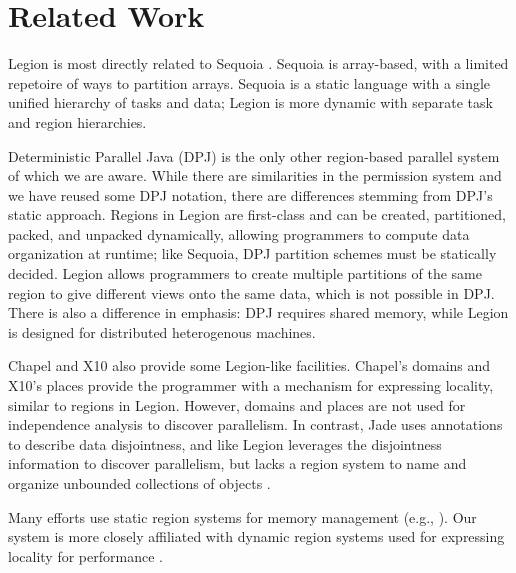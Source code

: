 
\section{Related Work}
\label{sec:related}
Legion is most directly related to Sequoia \cite{Fatahalian06}.  Sequoia is array-based, with
a limited repetoire of ways to partition arrays.  Sequoia is a static language with a single unified hierarchy
of tasks and data; Legion is more dynamic with separate task and region hierarchies.

Deterministic Parallel Java (DPJ) is the only other region-based parallel system of which we are
aware\cite{Bocchino09}.  While there are similarities in the permission system and we have
reused some DPJ notation, there are differences stemming from DPJ's static approach.
Regions in Legion are first-class and can be created, partitioned, packed, and unpacked 
dynamically, allowing programmers to compute data organization at runtime; like Sequoia, DPJ
partition schemes must be statically decided.  Legion allows 
programmers to create multiple partitions of the same region to give different 
views onto the same data, which is not possible in DPJ.  
There is also a difference in emphasis: DPJ requires shared memory, while Legion 
is designed for distributed heterogenous machines.

Chapel \cite{Chamberlain:Chapel} and X10 \cite{X1005} also provide some Legion-like facilities.
Chapel's domains and X10's places provide the programmer with a 
mechanism for expressing locality, similar to regions in Legion.  However, domains
and places are not used for independence analysis to discover parallelism.
In contrast, Jade uses annotations to describe
data disjointness,  and like Legion leverages the disjointness information
to discover parallelism, but lacks a region system to name and organize unbounded collections of objects \cite{Rinard98}.  

Many efforts use static region systems for  memory management (e.g., \cite{Tofte94, Grossman02}).
Our system is more closely affiliated with dynamic region systems used for expressing locality for performance \cite{Gay01}.


